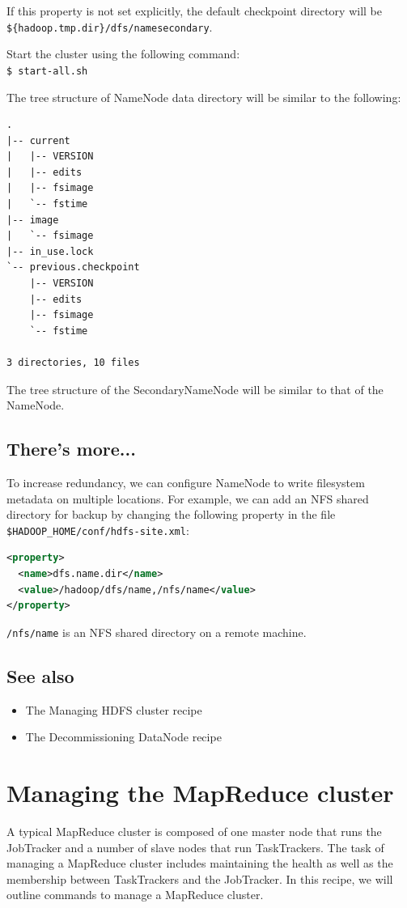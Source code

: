 If this property is not set explicitly, the default checkpoint directory will be \verb|${hadoop.tmp.dir}/dfs/namesecondary|.

Start the cluster using the following command: \\
\verb|$ start-all.sh|

The tree structure of NameNode data directory will be similar to the following:
\lstset{style=bashstyle}
\begin{lstlisting}
.
|-- current
|   |-- VERSION
|   |-- edits
|   |-- fsimage
|   `-- fstime
|-- image
|   `-- fsimage
|-- in_use.lock
`-- previous.checkpoint
    |-- VERSION
    |-- edits
    |-- fsimage
    `-- fstime

3 directories, 10 files
\end{lstlisting}

The tree structure of the SecondaryNameNode will be similar to that of the NameNode.

\subsection*{There's more...}
To increase redundancy, we can configure NameNode to write filesystem metadata on multiple locations. For example, we can add an NFS shared directory for backup by changing the following property in the file \verb|$HADOOP_HOME/conf/hdfs-site.xml|:
\lstset{style=bashstyle}
\begin{lstlisting}[language=XML]
<property>
  <name>dfs.name.dir</name>
  <value>/hadoop/dfs/name,/nfs/name</value>
</property>
\end{lstlisting}

\verb|/nfs/name| is an NFS shared directory on a remote machine.
\subsection*{See also}
\begin{itemize}
\item The Managing HDFS cluster recipe
\item The Decommissioning DataNode recipe
\end{itemize}
\section{Managing the MapReduce cluster}
A typical MapReduce cluster is composed of one master node that runs the JobTracker and a number of slave nodes that run TaskTrackers. The task of managing a MapReduce cluster includes maintaining the health as well as the membership between TaskTrackers and the JobTracker. In this recipe, we will outline commands to manage a MapReduce cluster.

